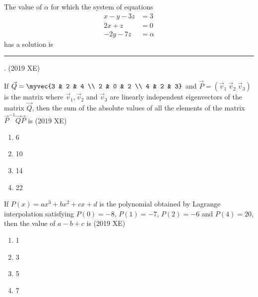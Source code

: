 \item The value of $\alpha$ for which the system of equations
	\begin{align*}
		x-y-3z&=3\\
		2x+z&=0\\
		-2y-7z&=\alpha
\end{align*}
 has a solution is \rule{1cm}{0.01pt}.
\hfill{(2019 XE)} 
\item If 
$\vec{Q} = \myvec{3 & 2 & 4 \\ 2 & 0 & 2 \\ 4 & 2 & 3}$ and $\vec{P}=(\vec{v}_1\ \vec{v}_2\ \vec{v}_3)$ is the matrix where $\vec{v}_1, \vec{v}_2$ and $\vec{v}_3$ are linearly independent eigenvectors of the matrix $\vec{Q}$, then the sum of the absolute values of all the elements of the matrix $\vec{P}^{-1}\vec{Q}\vec{P}$ is
\hfill{(2019 XE)} 
\begin{multicols}{4}
\begin{enumerate}
\item 6
\item 10
\item 14
\item 22
\end{enumerate}
\end{multicols}
\item If $P(x)=a x^3+b x^2+c x+d$ is the polynomial obtained by Lagrange interpolation satisfying $P(0)=-8$, $P(1)=-7$, $P(2)=-6$ and $P(4)=20$, then the value of $a-b+c$ is
\hfill{(2019 XE)} 
\begin{multicols}{4}
\begin{enumerate}
\item 1
\item 3
\item 5
\item 7
\end{enumerate}
\end{multicols}
